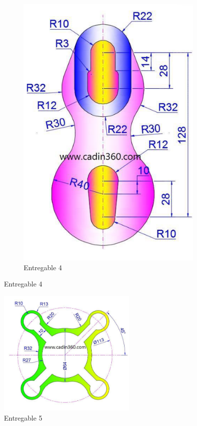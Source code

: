 \documentclass[letterpaper,pdftex]{article}
\begin{document}
\begin{figure}[h]
\begin{subfigure}[b]{0.45\textwidth}
         \includegraphics[width=\textwidth]{task4}
         \caption{Entregable 4}
         \label{fig:der4}
     \end{subfigure}
\end{figure}
%
\begin{figure}[h]
   \centering
   \includegraphics[width=0.6\textwidth]{task5}
   \caption{Entregable 5}
   \label{fig:der5}
\end{figure}
\end{document}
